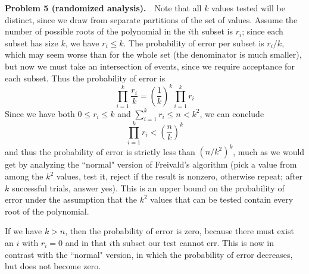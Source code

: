 \documentclass[11pt,a4paper]{article}
\begin{document}
\bigskip\noindent
\textbf{Problem 5 (randomized analysis).}\ \ 
Note that all $k$ values tested will be distinct, since we draw from separate
partitions of the set of values.  Assume the number of possible roots of
the polynomial in the $i$th subset is $r_i$; since each subset has size $k$,
we have $r_i\leq k$.  The probability of error per subset is $r_i/k$,
which may seem worse than for the whole set (the denominator is much smaller),
but now we must take an intersection of events, since we require acceptance
for each subset.  Thus the probability of error is
   $$\prod_{i=1}^k \frac{r_i}{k} = (\frac1k)^k\prod_{i=1}^k r_i$$
Since we have both $0 \leq r_i \leq k$ and $\sum_{i=1}^k r_i \leq n<k^2$,
we can conclude
     $$\prod_{i=1}^k r_i < (\frac{n}{k})^k$$
and thus the probability of error is strictly less than $(n/k^2)^k$,
much as we would get by analyzing the ``normal" version of Freivald's
algorithm (pick a value from among the $k^2$ values, test it, reject
if the result is nonzero, otherwise repeat; after $k$ successful trials,
answer yes).  This is an upper bound on the probability of error under
the assumption that the $k^2$ values that can be tested contain every root
of the polynomial.

If we have $k>n$, then the probability of error is zero, because there must
exist an $i$ with $r_i = 0$ and in that $i$th subset our test cannot err.
This is now in contrast with the ``normal" version, in which the probability
of error decreases, but does not become zero.
\end{document}
